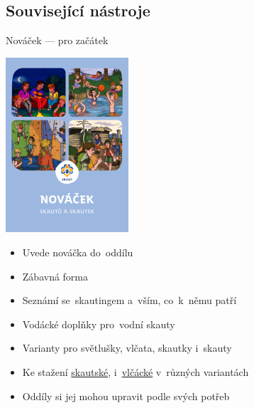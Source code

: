 \documentclass[compress, xelatex, 11pt, xcolor=dvipsnames, print, aspectratio=169,
	hyperref={
		bookmarks=true,
		unicode=true,
		colorlinks=true,
		pdftitle={Skautska vychovna metoda},
		plainpages=false,
		pdfauthor={Vojtech Zeisek},
		pdfsubject={Skautska vychovna metoda a jeji vyvoj za posledni stoleti a desetileti},
		pdfcreator={XeLaTeX},
		pdfkeywords={Junak, Pedagogika, Skaut, Skauting, Vychovna metoda},
		linkcolor=Red, %
		anchorcolor=ForestGreen, %
		citecolor=ForestGreen, %
		filecolor=ForestGreen, %
		menucolor=ForestGreen, %
		urlcolor=Sepia, %
		pdftex},
	url={hyphens, lowtilde} %
	]{beamer}
\begin{document}
\subsection{Související nástroje}

\begin{frame}{Nováček --- pro začátek}
	\begin{multicols}{2}
		\includegraphics[height=6.5cm]{novacek.png}
		\columnbreak
		\begin{itemize}
			\item Uvede nováčka do~oddílu
			\item Zábavná forma
			\item Seznámí se~skautingem a~vším, co~k~němu patří
			\item Vodácké doplňky pro~vodní skauty
			\item Varianty pro světlušky, vlčata, skautky i~skauty
			\item Ke stažení \href{https://stezka.skaut.cz/novacek/}{skautské}, i~\href{https://krizovatka.skaut.cz/svetlusky-zabicky-vlcata/stezky-a-cesticky-vlcat-svetlusek-a-zabicek/2021-03/novacek-vlcat-svetlusek-a-zabicek}{vlčácké} v~různých variantách
			\item Oddíly si jej mohou upravit podle svých potřeb
		\end{itemize}
	\end{multicols}
\end{frame}
\end{document}
